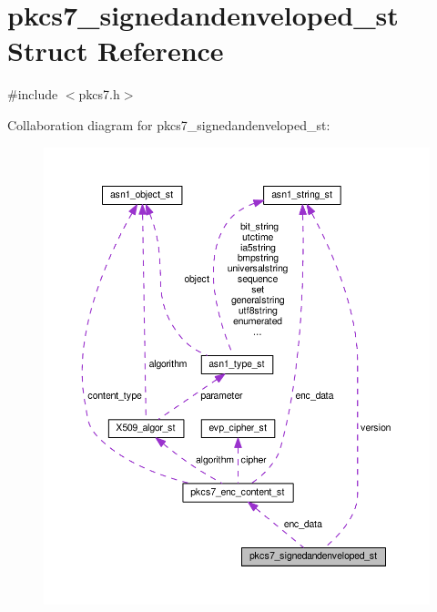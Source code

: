 \hypertarget{structpkcs7__signedandenveloped__st}{}\section{pkcs7\+\_\+signedandenveloped\+\_\+st Struct Reference}
\label{structpkcs7__signedandenveloped__st}


{\ttfamily \#include $<$pkcs7.\+h$>$}



Collaboration diagram for pkcs7\+\_\+signedandenveloped\+\_\+st\+:
\nopagebreak
\begin{figure}[H]
\begin{center}
\leavevmode
\includegraphics[width=350pt]{structpkcs7__signedandenveloped__st__coll__graph}
\end{center}
\end{figure}
